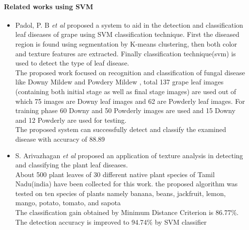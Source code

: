 \paragraph{Related works using SVM }
\begin{itemize}
    \item Padol, P. B \textit{et al} \cite{art6}  proposed a system  to aid in the detection and classification leaf diseases of grape using SVM classification technique. First the diseased region is found using segmentation by K-means clustering, then both color and texture features are extracted. Finally classification technique(svm) is used to detect the type of leaf disease.\\
    
    The proposed work focused on recognition and classification of fungal disease like Downy Mildew and Powdery Mildew ,  total 137 grape leaf images (containing both initial stage as well as final stage images) are used out of which 75 images are Downy leaf images and 62 are Powderly leaf images. For training phase 60 Downy and 50 Powderly images are used and 15 Downy and 12 Powderly are used for testing.\\ \vspace{4mm}
    The proposed system can successfully detect and classify the examined disease with accuracy of 88.89%
    
    \item S. Arivazhagan \textit{et al} \cite{art7} proposed  an application of texture analysis in detecting and classifying the plant leaf diseases.\\
    About 500 plant leaves of 30 different native plant species of Tamil Nadu(india) have been collected for this work. the proposed algorithm was tested on ten species of plants namely banana, beans, jackfruit, lemon, mango, potato, tomato, and sapota\\ \vspace{4mm}
    The classification gain obtained by Minimum Distance Criterion is 86.77\%. The detection accuracy is improved to 94.74\% by SVM classifier
\end{itemize}
